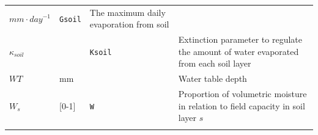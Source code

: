 \documentclass[]{book}
\begin{document}
\begin{longtable}[]{@{}llll@{}}
\begin{minipage}[t]{0.10\columnwidth}
\(mm \cdot day^{-1}\)\strut
\end{minipage} & \begin{minipage}[t]{0.12\columnwidth}\raggedright
\texttt{Gsoil}\strut
\end{minipage} & \begin{minipage}[t]{0.45\columnwidth}\raggedright
The maximum daily evaporation from soil\strut
\end{minipage}\tabularnewline
\begin{minipage}[t]{0.11\columnwidth}\raggedright
\(\kappa_{soil}\)\strut
\end{minipage} & \begin{minipage}[t]{0.10\columnwidth}\raggedright
\strut
\end{minipage} & \begin{minipage}[t]{0.12\columnwidth}\raggedright
\texttt{Ksoil}\strut
\end{minipage} & \begin{minipage}[t]{0.45\columnwidth}\raggedright
Extinction parameter to regulate the amount of water evaporated from each soil layer\strut
\end{minipage}\tabularnewline
\begin{minipage}[t]{0.11\columnwidth}\raggedright
\(WT\)\strut
\end{minipage} & \begin{minipage}[t]{0.10\columnwidth}\raggedright
mm\strut
\end{minipage} & \begin{minipage}[t]{0.12\columnwidth}\raggedright
\strut
\end{minipage} & \begin{minipage}[t]{0.45\columnwidth}\raggedright
Water table depth\strut
\end{minipage}\tabularnewline
\begin{minipage}[t]{0.11\columnwidth}\raggedright
\(W_{s}\)\strut
\end{minipage} & \begin{minipage}[t]{0.10\columnwidth}\raggedright
{[}0-1{]}\strut
\end{minipage} & \begin{minipage}[t]{0.12\columnwidth}\raggedright
\texttt{W}\strut
\end{minipage} & \begin{minipage}[t]{0.45\columnwidth}\raggedright
Proportion of volumetric moisture in relation to field capacity in soil layer \(s\)\strut
\end{minipage}\tabularnewline
\begin{minipage}[t]{0.11\columnwidth}\raggedright

\end{minipage}
\end{longtable}
\end{document}
